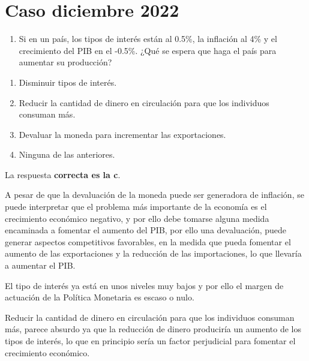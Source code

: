 \documentclass[
  letterpaper,
  DIV=11,
  numbers=noendperiod]{scrreprt}
\providecommand{\tightlist}{%
  \setlength{\itemsep}{0pt}\setlength{\parskip}{0pt}}\usepackage{longtable,booktabs,array}
\begin{document}
\hypertarget{caso-diciembre-2022}{%
\chapter*{Caso diciembre 2022}\label{caso-diciembre-2022}}


\begin{enumerate}
\def\labelenumi{\arabic{enumi}.}
\tightlist
\item
  Si en un país, los tipos de interés están al 0.5\%, la inflación al
  4\% y el crecimiento del PIB en el -0.5\%. ¿Qué se espera que haga el
  país para aumentar su producción?
\end{enumerate}

\begin{enumerate}
\def\labelenumi{\alph{enumi})}
\item
  Disminuir tipos de interés.
\item
  Reducir la cantidad de dinero en circulación para que los individuos
  consuman más.
\item
  Devaluar la moneda para incrementar las exportaciones.
\item
  Ninguna de las anteriores.
\end{enumerate}

\begin{tcolorbox}[enhanced jigsaw, left=2mm, opacityback=0, colback=white, breakable, arc=.35mm, bottomrule=.15mm, rightrule=.15mm, toprule=.15mm, leftrule=.75mm, colframe=quarto-callout-tip-color-frame]
\begin{minipage}[t]{5.5mm}
\textcolor{quarto-callout-tip-color}{\faLightbulb}
\end{minipage}%
\begin{minipage}[t]{\textwidth - 5.5mm}

La respuesta \textbf{correcta es la c}.

A pesar de que la devaluación de la moneda puede ser generadora de
inflación, se puede interpretar que el problema más importante de la
economía es el crecimiento económico negativo, y por ello debe tomarse
alguna medida encaminada a fomentar el aumento del PIB, por ello una
devaluación, puede generar aspectos competitivos favorables, en la
medida que pueda fomentar el aumento de las exportaciones y la reducción
de las importaciones, lo que llevaría a aumentar el PIB.

El tipo de interés ya está en unos niveles muy bajos y por ello el
margen de actuación de la Política Monetaria es escaso o nulo.

Reducir la cantidad de dinero en circulación para que los individuos
consuman más, parece absurdo ya que la reducción de dinero produciría un
aumento de los tipos de interés, lo que en principio sería un factor
perjudicial para fomentar el crecimiento económico.

\end{minipage}%
\end{tcolorbox}
\end{document}
